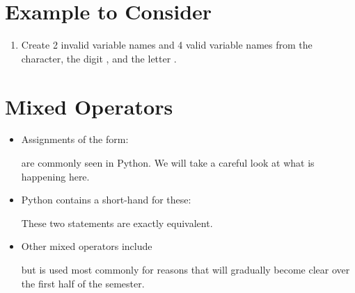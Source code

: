 \documentclass[letterpaper,10pt,english]{sphinxmanual}
\begin{document}
\section{Example to Consider}
\label{\detokenize{lecture_notes/lec02_calculator:example-to-consider}}\begin{enumerate}
\def\theenumi{\arabic{enumi}}
\def\labelenumi{\theenumi .}
\makeatletter\def\p@enumii{\p@enumi \theenumi .}\makeatother
\item {} 
Create 2 invalid variable names and 4 valid variable names from the
\sphinxcode{\sphinxupquote{\_}} character, the digit , and the letter .

\end{enumerate}


\section{Mixed Operators}
\label{\detokenize{lecture_notes/lec02_calculator:mixed-operators}}\begin{itemize}
\item {} 
Assignments of the form:

\begin{sphinxVerbatim}[commandchars=\\\{\}]
    
\end{sphinxVerbatim}

are commonly seen in Python. We will take a careful look at what is
happening here.

\item {} 
Python contains a short-hand for these:

\begin{sphinxVerbatim}[commandchars=\\\{\}]
  
\end{sphinxVerbatim}

These two statements are exactly equivalent.

\item {} 
Other mixed operators include

\begin{sphinxVerbatim}[commandchars=\\\{\}]
                 
\end{sphinxVerbatim}

but \sphinxcode{\sphinxupquote{+=}} is used most commonly for reasons that will gradually
become clear over the first half of the semester.

\end{itemize}
\end{document}
